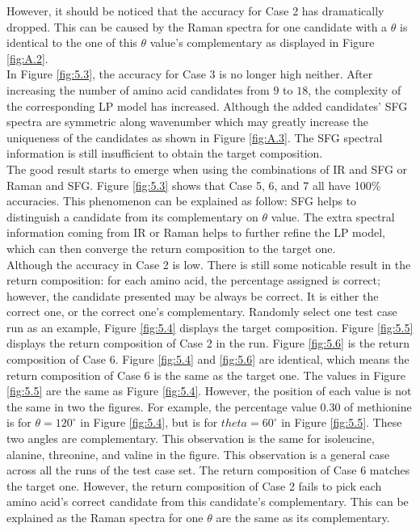 However, it should be noticed that the accuracy for Case 2 has dramatically dropped. This can be caused by the Raman spectra for one candidate with a $\theta$ is identical to the one of this $\theta$ value's complementary as displayed in Figure \ref{fig:A.2}. \\

In Figure \ref{fig:5.3}, the accuracy for Case 3 is no longer high neither. After increasing the number of amino acid candidates from $9$ to $18$, the complexity of the corresponding LP model has increased. Although the added candidates' SFG spectra are symmetric along wavenumber which may greatly increase the uniqueness of the candidates as shown in Figure \ref{fig:A.3}. The SFG spectral information is still insufficient to obtain the target composition. \\

The good result starts to emerge when using the combinations of IR and SFG or Raman and SFG. Figure \ref{fig:5.3} shows that Case 5, 6, and 7 all have 100\% accuracies. This phenomenon can be explained as follow: SFG helps to distinguish a candidate from its complementary on $\theta$ value. The extra spectral information coming from IR or Raman helps to further refine the LP model, which can then converge the return composition to the target one. \\

Although the accuracy in Case 2 is low. There is still some noticable result in the return composition: for each amino acid, the percentage assigned is correct; however, the candidate presented may be always be correct. It is either the correct one, or the correct one's complementary. Randomly select one test case run as an example, Figure \ref{fig:5.4} displays the target composition. Figure \ref{fig:5.5} displays the return composition of Case 2 in the run. Figure \ref{fig:5.6} is the return composition of Case 6. Figure \ref{fig:5.4} and \ref{fig:5.6} are identical, which means the return composition of Case 6 is the same as the target one. The values in Figure \ref{fig:5.5} are the same as Figure \ref{fig:5.4}. However, the position of each value is not the same in two the figures. For example, the percentage value $0.30$ of methionine is for $\theta = 120^{\circ}$ in Figure \ref{fig:5.4}, but is for $theta = 60^{\circ}$ in Figure \ref{fig:5.5}. These two angles are complementary. This observation is the same for isoleucine, alanine, threonine, and valine in the figure. This observation is a general case across all the runs of the test case set. The return composition of Case 6 matches the target one. However, the return composition of Case 2 fails to pick each amino acid's correct candidate from this candidate's complementary. This can be explained as the Raman spectra for one $\theta$ are the same as its complementary. \\

